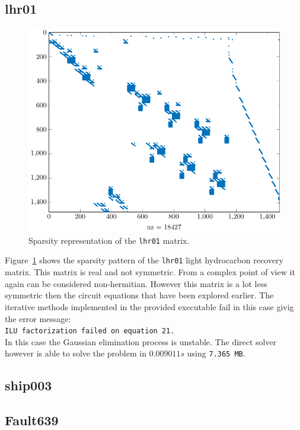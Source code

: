 \subsection{lhr01}
\begin{figure}
\centering
\includegraphics[scale=0.8]{../src/figure/lhr01.pdf}
\caption{Sparsity representation of the \texttt{lhr01} matrix.}
\label{fig:lhr01}
\end{figure}
Figure~\ref{fig:lhr01} shows the sparsity pattern of the \texttt{lhr01} light hydrocarbon recovery matrix. This matrix is real and not symmetric. From a complex point of view it again can be considered non-hermitian. However this matrix is a lot less symmetric then the circuit equations that have been explored earlier. The iterative methods implemented in the provided executable fail in this case givig the error message: \\
\texttt{ILU factorization failed on equation 21.} \\
In this case the Gaussian elimination process is unstable. %
 The direct solver however is able to solve the problem in $0.009011 s$ using \texttt{7.365 MB}.



\subsection{ship003}

\subsection{Fault639}